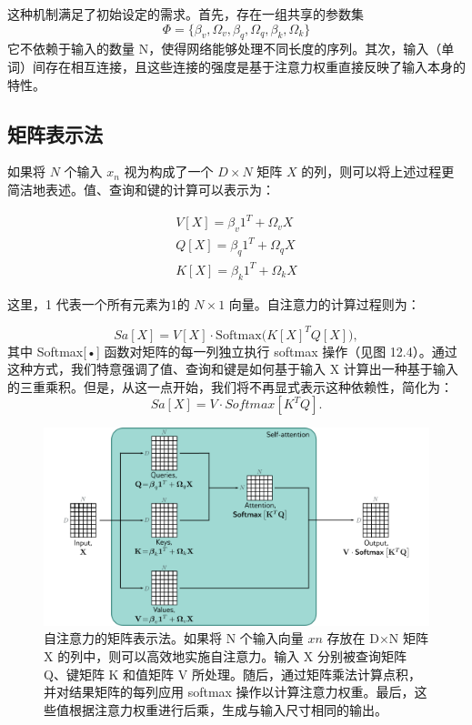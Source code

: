 这种机制满足了初始设定的需求。首先，存在一组共享的参数集 
\begin{equation*}
\Phi = \{\beta_v,\Omega_v,\beta_q,\Omega_q,\beta_k,\Omega_k\}    
\end{equation*}
它不依赖于输入的数量 N，使得网络能够处理不同长度的序列。其次，输入（单词）间存在相互连接，且这些连接的强度是基于注意力权重直接反映了输入本身的特性。

\subsection{矩阵表示法}
如果将 \(N\) 个输入 \(x_n\) 视为构成了一个 \(D \times N\) 矩阵 \(X\) 的列，则可以将上述过程更简洁地表述。值、查询和键的计算可以表示为：


\begin{align}
V[X] = \beta_v 1^T + \Omega_v X \\
Q[X] = \beta_q 1^T + \Omega_q X \\
K[X] = \beta_k 1^T + \Omega_k X 
\end{align} 


这里，1 代表一个所有元素为1的 \(N \times 1\) 向量。自注意力的计算过程则为：

\begin{equation}
Sa[X] = V[X] \cdot \text{Softmax} \big( K[X]^T Q[X] \big), 
\end{equation}
其中 Softmax[•] 函数对矩阵的每一列独立执行 softmax 操作（见图 12.4）。通过这种方式，我们特意强调了值、查询和键是如何基于输入 X 计算出一种基于输入的三重乘积。但是，从这一点开始，我们将不再显式表示这种依赖性，简化为：
\begin{equation}
Sa[X] = V · Softmax[K^T Q]. 
\end{equation}
\begin{figure}[ht!]
\centering
\includegraphics[width=0.7\linewidth]{png/chapter12/TransformerBlockSA.png}
\caption{自注意力的矩阵表示法。如果将 N 个输入向量 \(xn\) 存放在 D×N 矩阵 X 的列中，则可以高效地实施自注意力。输入 X 分别被查询矩阵 Q、键矩阵 K 和值矩阵 V 所处理。随后，通过矩阵乘法计算点积，并对结果矩阵的每列应用 softmax 操作以计算注意力权重。最后，这些值根据注意力权重进行后乘，生成与输入尺寸相同的输出。}
\end{figure}


